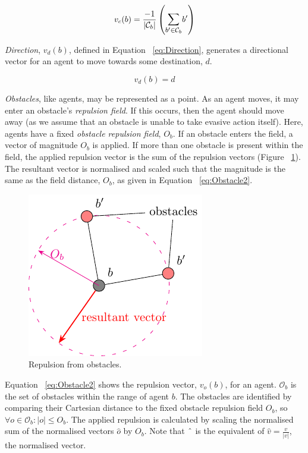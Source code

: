 \documentclass[letterpaper]{article}
\newcommand{\card}[1]{\vert{#1}\vert}
\newcommand{\magn}[1]{\vert{#1}\vert}
\begin{document}
\begin{equation}\label{eq:FlyToCentre1}
	v_c(b) =
	\frac{-1}{\card{\mathcal C_b}}\left({\mathlarger{\sum_{b' \in
	\mathcal C_b}}{b'}}\right)
\end{equation}

\textit{Direction}, $v_d(b)$, defined in Equation ~\ref{eq:Direction}, generates a directional vector for an agent to move towards some destination, $d$.

\begin{equation}
\label{eq:Direction}
v_d(b) = d
\end{equation}

{\it Obstacles}, like agents, may be represented as a point. As an agent moves, it may enter an obstacle's \textit{repulsion field}. If this occurs, then the agent should move away (as we assume that an obstacle is unable to take evasive action itself). Here, agents have a fixed \textit{obstacle repulsion field}, $O_b$. If an obstacle enters the field, a vector of magnitude $O_b$ is applied. If more than one obstacle is present within the field, the applied repulsion vector is the sum of the repulsion vectors (Figure ~\ref{fig:Obstacle1}). The resultant vector is normalised and scaled such that the magnitude is the same as the field distance, $O_b$, as given in Equation ~\ref{eq:Obstacle2}.

\begin{figure}
\begin{center}
\includegraphics{figures/obstacles}
\end{center}
\caption{Repulsion from obstacles. \label{fig:Obstacle1}}
\end{figure}

Equation ~\ref{eq:Obstacle2} shows the repulsion vector, $v_o(b)$, for an agent. $\mathcal O_b$ is the set of obstacles within the range of agent $b$. The obstacles are identified by comparing their Cartesian distance to the fixed obstacle repulsion field $O_b$, so $\forall o \in \mathcal O_b : \magn{o}\leq O_b$. The applied repulsion is calculated by scaling the normalised sum of the normalised vectors $\hat o$ by $O_b$.  Note that $\string^$ is the equivalent of $\hat v = \frac{v}{\magn{v}}$, the normalised vector.
\end{document}
